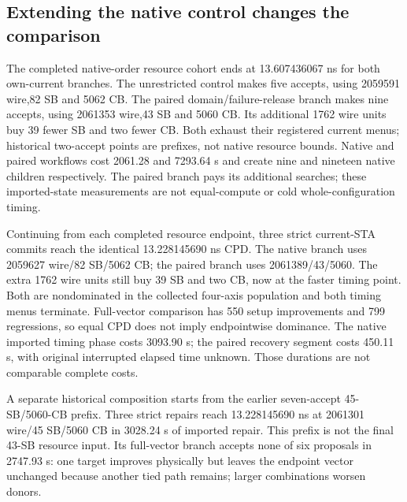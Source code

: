 \documentclass[conference,10pt]{IEEEtran}
\begin{document}
\subsection{Extending the native control changes the comparison}
The completed native-order resource cohort ends at 13.607436067 ns for both own-current branches. The unrestricted control makes five accepts, using 2059591 wire,82 SB and 5062 CB. The paired domain/failure-release branch makes nine accepts, using 2061353 wire,43 SB and 5060 CB. Its additional 1762 wire units buy 39 fewer SB and two fewer CB. Both exhaust their registered current menus; historical two-accept points are prefixes, not native resource bounds. Native and paired workflows cost 2061.28 and 7293.64 s and create nine and nineteen native children respectively. The paired branch pays its additional searches; these imported-state measurements are not equal-compute or cold whole-configuration timing.

Continuing from each completed resource endpoint, three strict current-STA commits reach the identical 13.228145690 ns CPD. The native branch uses 2059627 wire/82 SB/5062 CB; the paired branch uses 2061389/43/5060. The extra 1762 wire units still buy 39 SB and two CB, now at the faster timing point. Both are nondominated in the collected four-axis population and both timing menus terminate. Full-vector comparison has 550 setup improvements and 799 regressions, so equal CPD does not imply endpointwise dominance. The native imported timing phase costs 3093.90 s; the paired recovery segment costs 450.11 s, with original interrupted elapsed time unknown. Those durations are not comparable complete costs.

A separate historical composition starts from the earlier seven-accept 45-SB/5060-CB prefix. Three strict repairs reach 13.228145690 ns at 2061301 wire/45 SB/5060 CB in 3028.24 s of imported repair. This prefix is not the final 43-SB resource input. Its full-vector branch accepts none of six proposals in 2747.93 s: one target improves physically but leaves the endpoint vector unchanged because another tied path remains; larger combinations worsen donors.
\end{document}
